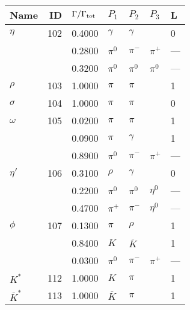 \documentclass[a4paper,10pt]{article}
\begin{document}
\begin{tabular} {lrlllll} 
\toprule
Name & ID & $\Gamma/\Gamma_{\rm tot}$ & $P_1$ & $P_2$ & $P_3$ & L \\ 
\midrule
$      \eta          $&102&  0.4000&$ \gamma              $&$ \gamma              $&$                     $& 0\\
$                    $&   &  0.2800&$ \pi^0               $&$ \pi^-               $&$ \pi^+               $& ---\\
$                    $&   &  0.3200&$ \pi^0               $&$ \pi^0               $&$ \pi^0               $& ---\\
\midrule
$      \rho          $&103&  1.0000&$ \pi                 $&$ \pi                 $&$                     $& 1\\
\midrule
$      \sigma        $&104&  1.0000&$ \pi                 $&$ \pi                 $&$                     $& 0\\
\midrule
$      \omega        $&105&  0.0200&$ \pi                 $&$ \pi                 $&$                     $& 1\\
$                    $&   &  0.0900&$ \pi                 $&$ \gamma              $&$                     $& 1\\
$                    $&   &  0.8900&$ \pi^0               $&$ \pi^-               $&$ \pi^+               $& ---\\
\midrule
$      \eta'         $&106&  0.3100&$ \rho                $&$ \gamma              $&$                     $& 0\\
$                    $&   &  0.2200&$ \pi^0               $&$ \pi^0               $&$ \eta^0              $& ---\\
$                    $&   &  0.4700&$ \pi^+               $&$ \pi^-               $&$ \eta^0              $& ---\\
\midrule
$      \phi          $&107&  0.1300&$ \pi                 $&$ \rho                $&$                     $& 1\\
$                    $&   &  0.8400&$ K                   $&$ \overline{K}        $&$                     $& 1\\
$                    $&   &  0.0300&$ \pi^0               $&$ \pi^-               $&$ \pi^+               $& ---\\
\midrule
$      K^*           $&112&  1.0000&$ K                   $&$ \pi                 $&$                     $& 1\\
\midrule
$      \overline{K}^*$&113&  1.0000&$ \overline{K}        $&$ \pi                 $&$                     $& 1\\

\end{tabular}
\end{document}
